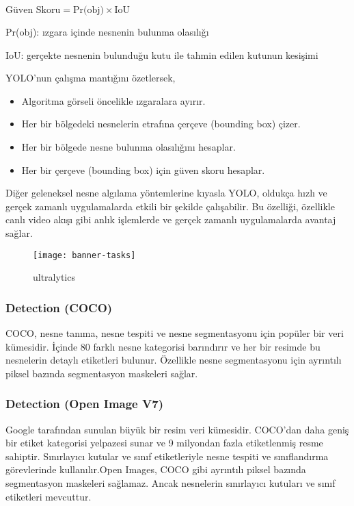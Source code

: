 \documentclass[11pt,a4paper]{report}
\begin{document}
\begin{justify}
   	$ \text{Güven Skoru} = \text{Pr(obj)} \times \text{IoU} $
   	\newline
   	
   	Pr(obj): ızgara içinde nesnenin bulunma olasılığı
   	
   	IoU: gerçekte nesnenin bulunduğu kutu ile tahmin edilen kutunun kesişimi
   	\newline
   	
   	YOLO’nun çalışma mantığını özetlersek,
   	\begin{itemize}
   		\item Algoritma görseli öncelikle ızgaralara ayırır.
   		
   		\item Her bir bölgedeki nesnelerin etrafına çerçeve (bounding box) çizer.
   		
   		\item Her bir bölgede nesne bulunma olasılığını hesaplar.
   		
   		\item Her bir çerçeve (bounding box) için güven skoru hesaplar.
   	\end{itemize}
   	Diğer geleneksel nesne algılama yöntemlerine kıyasla YOLO, oldukça hızlı ve gerçek zamanlı uygulamalarda etkili bir şekilde çalışabilir. Bu özelliği, özellikle canlı video akışı gibi anlık işlemlerde ve gerçek zamanlı uygulamalarda avantaj sağlar.
   	
   	\begin{figure}[!h]
   		\centering
   		\texttt{[image: banner-tasks]}
   		\caption{ultralytics}
   		\label{fig:ornek5}
   	\end{figure}
   	\subsubsection{Detection (COCO)}
   	
   	COCO, nesne tanıma, nesne tespiti ve nesne segmentasyonu için popüler bir veri kümesidir. İçinde 80 farklı nesne kategorisi barındırır ve her bir resimde bu nesnelerin detaylı etiketleri bulunur. Özellikle nesne segmentasyonu için ayrıntılı piksel bazında segmentasyon maskeleri sağlar.
   	
   	\subsubsection{Detection (Open Image V7)}
   	
   	Google tarafından sunulan büyük bir resim veri kümesidir. COCO'dan daha geniş bir etiket kategorisi yelpazesi sunar ve 9 milyondan fazla etiketlenmiş resme sahiptir. Sınırlayıcı kutular ve sınıf etiketleriyle nesne tespiti ve sınıflandırma görevlerinde kullanılır.Open Images, COCO gibi ayrıntılı piksel bazında segmentasyon maskeleri sağlamaz. Ancak nesnelerin sınırlayıcı kutuları ve sınıf etiketleri mevcuttur.
   	\newline
   	

\end{justify}
\end{document}

